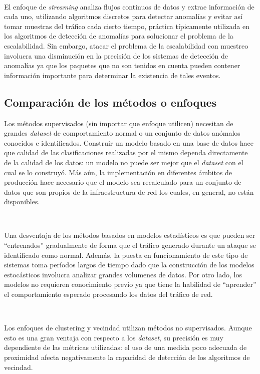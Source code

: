 \documentclass[a4paper,12pt, oneside]{article}
\begin{document}
\

El enfoque de \textit{streaming} analiza flujos continuos de datos y extrae información de cada uno, utilizando algoritmos discretos para detectar anomalías\cite{Cormode:2010:ANG:1805876} y evitar así tomar muestras del tráfico cada cierto tiempo, práctica típicamente utilizada en los algoritmos de detección de anomalías para solucionar el problema de la escalabilidad. Sin embargo, atacar el problema de la escalabilidad con muestreo involucra una disminución en la precisión de los sistemas de detección de anomalías ya que los paquetes que no son tenidos en cuenta pueden contener información importante para determinar la existencia de tales eventos.

\subsection{Comparación de los métodos o enfoques}
Los métodos supervisados (sin importar que enfoque utilicen) necesitan de grandes \textit{dataset} de comportamiento normal o un conjunto de datos anómalos conocidos e identificados. Construir un modelo basado en una base de datos hace que calidad de las clasificaciones realizadas por el mismo dependa directamente de la calidad de los datos: un modelo no puede ser mejor que el \textit{dataset} con el cual se lo construyó. Más aún, la implementación en diferentes ámbitos de producción hace necesario que el modelo sea recalculado para un conjunto de datos que son propios de la infraestructura de red los cuales, en general, no están disponibles.

\

Una desventaja de los métodos basados en modelos estadísticos es que pueden ser ``entrenados'' gradualmente de forma que el tráfico generado durante un ataque se identificado como normal. Además, la puesta en funcionamiento de este tipo de sistemas toma períodos largos de tiempo dado que la construcción de los modelos estocásticos involucra analizar grandes volumenes de datos. Por otro lado, los modelos no requieren conocimiento previo ya que tiene la habilidad de ``aprender'' el comportamiento esperado procesando los datos del tráfico de red\cite{journals/comsur/BhuyanBK14}.

\

Los enfoques de clustering y vecindad utilizan métodos no supervisados. Aunque esto es una gran ventaja con respecto a los \textit{dataset}, su precisión es muy dependiente de las métricas utilizadas: el uso de una medida poco adecuada de proximidad afecta negativamente la capacidad de detección de los algoritmos de vecindad.
\end{document}
